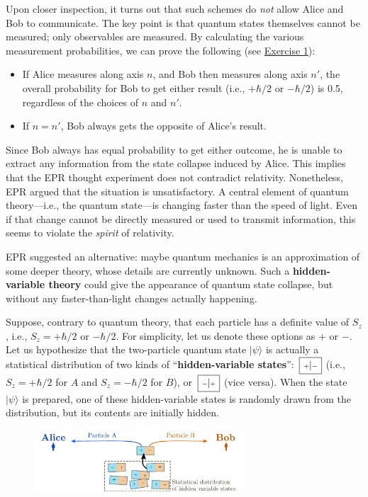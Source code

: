 \documentclass[pra,12pt]{revtex4-2}
\def\hvbox[#1]#2{\,\boxed{\scalebox{0.7}{$\,#1$}|\scalebox{0.7}{$#2\,$}}}
\begin{document}
Upon closer inspection, it turns out that such schemes do \textit{not}
allow Alice and Bob to communicate.  The key point is that quantum
states themselves cannot be measured; only observables are measured.
By calculating the various measurement probabilities, we can prove the
following (see \hyperref[ex:singletproperties]{Exercise 1}):

\begin{itemize}
\item
  If Alice measures along axis $n$, and Bob then measures along axis
  $n'$, the overall probability for Bob to get either result (i.e.,
  $+\hbar/2$ or $-\hbar/2$) is 0.5, regardless of the choices of $n$
  and $n'$.

\item If $n = n'$, Bob always gets the opposite of Alice's result.
\end{itemize}

Since Bob always has equal probability to get either outcome, he is
unable to extract any information from the state collapse induced by
Alice.  This implies that the EPR thought experiment does not
contradict relativity.  Nonetheless, EPR argued that the situation is
unsatisfactory.  A central element of quantum theory---i.e., the
quantum state---is changing faster than the speed of light.  Even if
that change cannot be directly measured or used to transmit
information, this seems to violate the \textit{spirit} of relativity.

EPR suggested an alternative: maybe quantum mechanics is an
approximation of some deeper theory, whose details are currently
unknown.  Such a \textbf{hidden-variable theory} could give the
appearance of quantum state collapse, but without any
faster-than-light changes actually happening.

Suppose, contrary to quantum theory, that each particle has a definite
value of $S_z$, i.e., $S_z = +\hbar/2$ or $-\hbar/2$.  For simplicity,
let us denote these options as $+$ or $-$.  Let us hypothesize that
the two-particle quantum state $|\psi\rangle$ is actually a
statistical distribution of two kinds of ``\textbf{hidden-variable
  states}'': $\hvbox[+]{-}$ (i.e., $S_z = +\hbar/2$ for $A$ and $S_z =
-\hbar/2$ for $B$), or $\hvbox[-]{+}$ (vice versa).  When the state
$|\psi\rangle$ is prepared, one of these hidden-variable states is
randomly drawn from the distribution, but its contents are initially
hidden.

\begin{figure}[h]
  \centering\includegraphics[width=0.7\textwidth]{hiddenvariables}
\end{figure}
\end{document}
